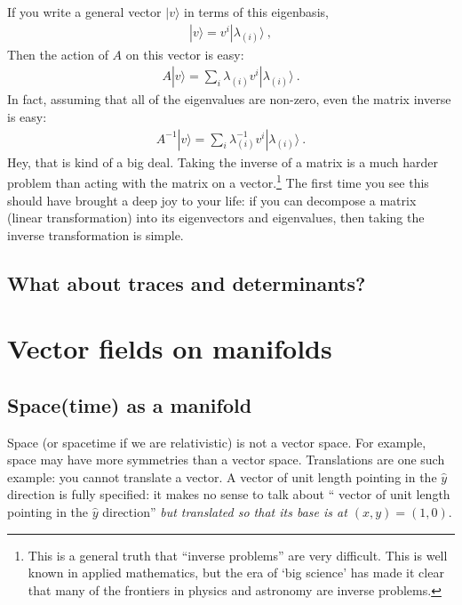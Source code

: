 \documentclass[
  11pt,
	colorful,
	raggedright,
]{tufte-style-thesis-flip}
\begin{document}
If you write a general vector $|v\rangle$ in terms of this eigenbasis,
\begin{align}
  |v\rangle = v^i |\lambda_{(i)} \rangle \ ,
\end{align}
Then the action of $A$ on this vector is easy:
\begin{align}
  A |v\rangle = \sum_i \lambda_{(i)} v^i |\lambda_{(i)} \rangle \ .
\end{align}
In fact, assuming that all of the eigenvalues are non-zero, even the matrix inverse is easy:
\begin{align}
  A^{-1}|v\rangle = \sum_i \lambda_{(i)}^{-1} v^i |\lambda_{(i)} \rangle \ .
  \label{eq:linear:aglebra:inverse:eigenvectors}
\end{align}
Hey, that is kind of a big deal. Taking the inverse of a matrix is a much harder problem than acting with the matrix on a vector.\footnote{This is a general truth that ``inverse problems'' are very difficult. This is well known in applied mathematics, but the era of `big science' has made it clear that many of the frontiers in physics and astronomy are inverse problems.}
The first time you see this should have brought a deep joy to your life: if you can decompose a matrix (linear transformation) into its eigenvectors and eigenvalues, then taking the inverse transformation is simple.





\section{What about traces and determinants?}



\chapter{Vector fields on manifolds}
\label{chap:vector:fields}


\section{Space(time) as a manifold}

Space (or spacetime if we are relativistic) is not a vector space. For example, space may have more symmetries than a vector space. Translations are one such example: you cannot translate a vector. A vector of unit length pointing in the $\hat{y}$ direction is fully specified: it makes no sense to talk about `` vector of unit length pointing in the $\hat{y}$ direction'' \emph{but translated so that its base is at $(x,y)=(1,0)$}. 
\end{document}
